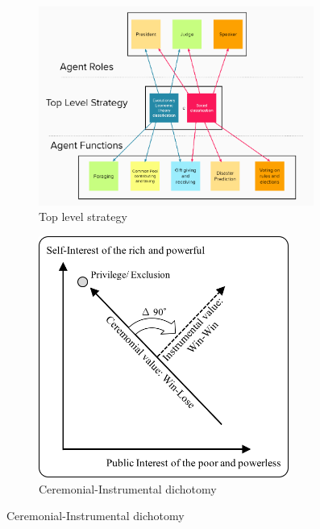 \begin{figure}[!htb]
    \centering
    \begin{subfigure}{.49\textwidth}
        \centering
        \includegraphics[width=0.99\textwidth]{images/strategies.png}
        \caption{Top level strategy}
        \label{fig: top level strategy}    
    \end{subfigure}
    \begin{subfigure}{.49\textwidth}
        \centering
        \includegraphics[width=0.9\textwidth]{images/dichotomy.png}
        \caption{Ceremonial-Instrumental dichotomy}
        \label{fig: dichotomy}
    \end{subfigure}
\end{figure}

